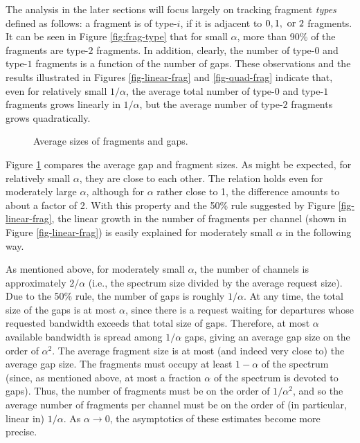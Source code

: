 \documentclass{amsart}
\begin{document}
The analysis in the later
sections  will focus  largely  on tracking  fragment  {\em types}  defined  as follows:  a
fragment  is of  type-$i$, if  it is  adjacent to  $0,1,~{\rm or}~2$  fragments. It can be seen in Figure \ref{fig:frag-type} that for small $\alpha$, more than 90\% of the fragments are type-$2$ fragments. In addition, clearly, the number of type-$0$ and type-$1$ fragments is a function of the number of gaps. These observations and the  results illustrated in
Figures \ref{fig-linear-frag} and \ref{fig-quad-frag} indicate that, even for relatively
small $1/\alpha$, the average total number  of type-$0$ and type-$1$ fragments grows linearly in
$1/\alpha$, but the average number of type-$2$ fragments grows quadratically.

\begin{figure}[!t]
\begin{center}
 \vspace*{-0.5cm}
 \caption{Average sizes of fragments and gaps.}
 \label{fig-size-frag-gap}
\end{center}
\end{figure}
Figure \ref{fig-size-frag-gap}  compares the  average gap and fragment sizes.  As might be expected, for relatively  small $\alpha$, they are close to each other.
The relation holds even for moderately  large $\alpha$, although for
$\alpha$ rather  close to  1, the difference  amounts to  about a factor  of 2.  With this
property and the 50\% rule suggested by Figure \ref{fig-linear-frag}, the linear growth in
the number of fragments per channel (shown in Figure \ref{fig-linear-frag}) is easily explained for moderately small $\alpha$ in the following way.



As mentioned above, for moderately small  $\alpha$, the number of channels is approximately $2/\alpha$ (i.e., the spectrum size divided by the average request
size). Due to the 50\% rule, the number  of gaps is roughly $1/\alpha$. At any time, the
total size of the gaps  is at most $\alpha$, since  there is a request waiting  for departures whose
requested bandwidth exceeds that total size of gaps. Therefore, at  most $\alpha$ available bandwidth is spread  among $1/\alpha$ gaps,
giving an average gap  size on the order of $\alpha^2$. The average fragment size is
at most (and indeed very close to) the average gap size. The fragments must occupy at least $1-\alpha$ of the spectrum (since, as mentioned above, at
most a fraction  $\alpha$ of the spectrum is devoted to gaps).  Thus, the  number of fragments
must be on the  order of $1/\alpha^2$, and so the average  number of fragments per channel
must be on  the order of (in  particular, linear in) $1/\alpha$. As  $\alpha \rightarrow 0$, the  asymptotics of these
estimates become more precise.
\end{document}
